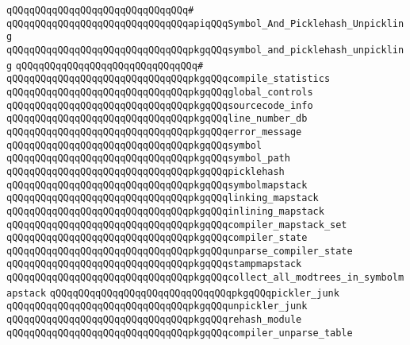 \verb|qQQqqQQqqQQqqQQqqQQqqQQqqQQqqQQq#|\newline
\verb|qQQqqQQqqQQqqQQqqQQqqQQqqQQqqQQqapiqQQqSymbol_And_Picklehash_Unpickling|\newline
\verb|qQQqqQQqqQQqqQQqqQQqqQQqqQQqqQQqpkgqQQqsymbol_and_picklehash_unpickling|\newline
\verb|qQQqqQQqqQQqqQQqqQQqqQQqqQQqqQQq#|\newline
\verb|qQQqqQQqqQQqqQQqqQQqqQQqqQQqqQQqpkgqQQqcompile_statistics|\newline
\verb|qQQqqQQqqQQqqQQqqQQqqQQqqQQqqQQqpkgqQQqglobal_controls|\newline
\verb|qQQqqQQqqQQqqQQqqQQqqQQqqQQqqQQqpkgqQQqsourcecode_info|\newline
\verb|qQQqqQQqqQQqqQQqqQQqqQQqqQQqqQQqpkgqQQqline_number_db|\newline
\verb|qQQqqQQqqQQqqQQqqQQqqQQqqQQqqQQqpkgqQQqerror_message|\newline
\verb|qQQqqQQqqQQqqQQqqQQqqQQqqQQqqQQqpkgqQQqsymbol|\newline
\verb|qQQqqQQqqQQqqQQqqQQqqQQqqQQqqQQqpkgqQQqsymbol_path|\newline
\verb|qQQqqQQqqQQqqQQqqQQqqQQqqQQqqQQqpkgqQQqpicklehash|\newline
\verb|qQQqqQQqqQQqqQQqqQQqqQQqqQQqqQQqpkgqQQqsymbolmapstack|\newline
\verb|qQQqqQQqqQQqqQQqqQQqqQQqqQQqqQQqpkgqQQqlinking_mapstack|\newline
\verb|qQQqqQQqqQQqqQQqqQQqqQQqqQQqqQQqpkgqQQqinlining_mapstack|\newline
\verb|qQQqqQQqqQQqqQQqqQQqqQQqqQQqqQQqpkgqQQqcompiler_mapstack_set|\newline
\verb|qQQqqQQqqQQqqQQqqQQqqQQqqQQqqQQqpkgqQQqcompiler_state|\newline
\verb|qQQqqQQqqQQqqQQqqQQqqQQqqQQqqQQqpkgqQQqunparse_compiler_state|\newline
\verb|qQQqqQQqqQQqqQQqqQQqqQQqqQQqqQQqpkgqQQqstampmapstack|\newline
\verb|qQQqqQQqqQQqqQQqqQQqqQQqqQQqqQQqpkgqQQqcollect_all_modtrees_in_symbolmapstack|\newline
\verb|qQQqqQQqqQQqqQQqqQQqqQQqqQQqqQQqpkgqQQqpickler_junk|\newline
\verb|qQQqqQQqqQQqqQQqqQQqqQQqqQQqqQQqpkgqQQqunpickler_junk|\newline
\verb|qQQqqQQqqQQqqQQqqQQqqQQqqQQqqQQqpkgqQQqrehash_module|\newline
\verb|qQQqqQQqqQQqqQQqqQQqqQQqqQQqqQQqpkgqQQqcompiler_unparse_table|\newline
